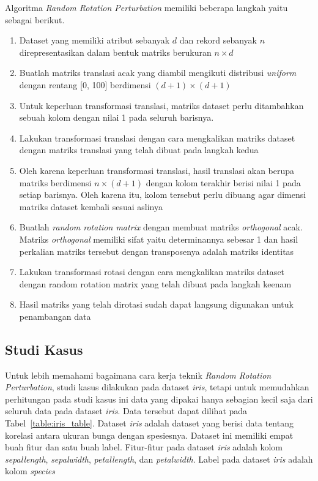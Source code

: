 Algoritma \textit{Random Rotation Perturbation} memiliki beberapa langkah yaitu sebagai berikut.
\begin{enumerate}
    \item Dataset yang memiliki atribut sebanyak \(d\) dan rekord sebanyak \(n\) direpresentasikan dalam bentuk matriks berukuran \(n \times d\)
    \item Buatlah matriks translasi acak yang diambil mengikuti distribusi \textit{uniform} dengan rentang [0, 100] berdimensi \((d+1)\times(d+1)\)
    \item Untuk keperluan transformasi translasi, matriks dataset perlu ditambahkan sebuah kolom dengan nilai 1 pada seluruh barisnya.
    \item Lakukan transformasi translasi dengan cara mengkalikan matriks dataset dengan matriks translasi yang telah dibuat pada langkah kedua
    \item Oleh karena keperluan transformasi translasi, hasil translasi akan berupa matriks berdimensi \(n\times(d+1)\) dengan kolom terakhir berisi nilai 1 pada setiap barisnya. Oleh karena itu, kolom tersebut perlu dibuang agar dimensi matriks dataset kembali sesuai aslinya
    \item Buatlah \textit{random rotation matrix} dengan membuat matriks \textit{orthogonal} acak. Matriks \textit{orthogonal} memiliki sifat yaitu determinannya sebesar 1 dan hasil perkalian matriks tersebut dengan transposenya adalah matriks identitas
    \item Lakukan transformasi rotasi dengan cara mengkalikan matriks dataset dengan random rotation matrix yang telah dibuat pada langkah keenam
    \item Hasil matriks yang telah dirotasi sudah dapat langsung digunakan untuk penambangan data
\end{enumerate}

\subsection{Studi Kasus}
\label{subsec:studi-kasus-rotation}

Untuk lebih memahami bagaimana cara kerja teknik \textit{Random Rotation Perturbation}, studi kasus dilakukan pada dataset \textit{iris}, tetapi untuk memudahkan perhitungan pada studi kasus ini data yang dipakai hanya sebagian kecil saja dari seluruh data pada dataset \textit{iris}. Data tersebut dapat dilihat pada Tabel~\ref{table:iris_table}. Dataset \textit{iris} adalah dataset yang berisi data tentang korelasi antara ukuran bunga dengan spesiesnya. Dataset ini memiliki empat buah fitur dan satu buah label. Fitur-fitur pada dataset \textit{iris} adalah kolom \textit{sepal\textunderscore length}, \textit{sepal\textunderscore width}, \textit{petal\textunderscore length}, dan \textit{petal\textunderscore width}. Label pada dataset \textit{iris} adalah kolom \textit{species}

